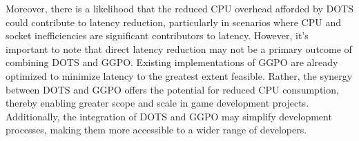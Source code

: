 Moreover, there is a likelihood that the reduced CPU overhead afforded by DOTS could contribute to latency reduction, particularly in scenarios where CPU and socket inefficiencies are significant contributors to latency. However, it's important to note that direct latency reduction may not be a primary outcome of combining DOTS and GGPO. Existing implementations of GGPO are already optimized to minimize latency to the greatest extent feasible. Rather, the synergy between DOTS and GGPO offers the potential for reduced CPU consumption, thereby enabling greater scope and scale in game development projects. Additionally, the integration of DOTS and GGPO may simplify development processes, making them more accessible to a wider range of developers.



